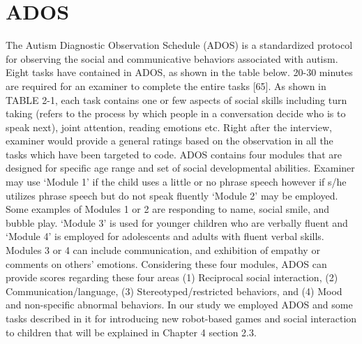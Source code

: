 \section{ADOS}
The Autism Diagnostic Observation Schedule (ADOS) is a standardized protocol
for observing the social and communicative behaviors associated with autism. Eight tasks
have contained in ADOS, as shown in the table below. 20-30 minutes are required for an
examiner to complete the entire tasks [65].
As shown in TABLE 2-1, each task contains one or few aspects of social skills
including turn taking (refers to the process by which people in a conversation decide who
is to speak next), joint attention, reading emotions etc. Right after the interview, examiner
would provide a general ratings based on the observation in all the tasks which have been
targeted to code.
ADOS contains four modules that are designed for specific age range and set of social
developmental abilities. Examiner may use ‘Module 1’ if the child uses a little or no phrase
speech however if s/he utilizes phrase speech but do not speak fluently ‘Module 2’ may be
employed. Some examples of Modules 1 or 2 are responding to name, social smile, and
bubble play. ‘Module 3’ is used for younger children who are verbally fluent and ‘Module
4’ is employed for adolescents and adults with fluent verbal skills. Modules 3 or 4 can
include communication, and exhibition of empathy or comments on others' emotions.
Considering these four modules, ADOS can provide scores regarding these four areas (1)
Reciprocal social interaction, (2) Communication/language, (3) Stereotyped/restricted
behaviors, and (4) Mood and non-specific abnormal behaviors. In our study we employed
ADOS and some tasks described in it for introducing new robot-based games and social
interaction to children that will be explained in Chapter 4 section 2.3.



